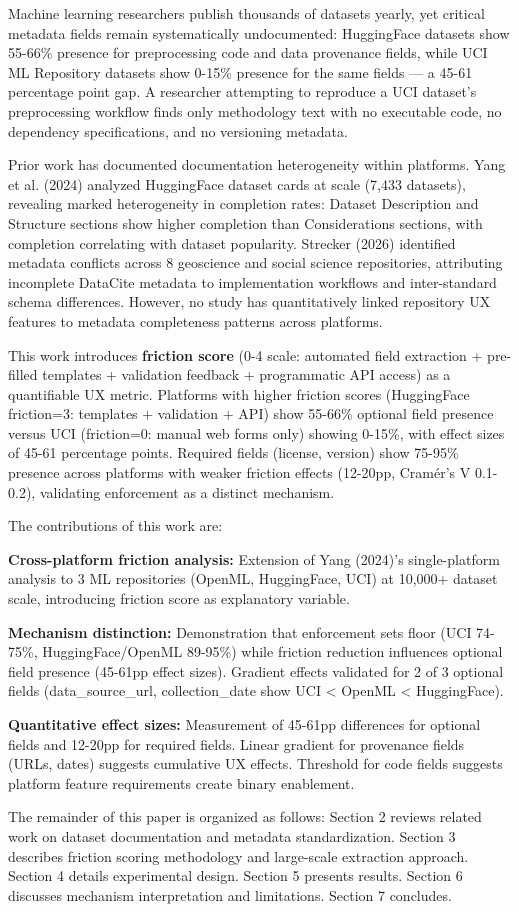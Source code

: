 
Machine learning researchers publish thousands of datasets yearly, yet critical metadata fields remain systematically undocumented: HuggingFace datasets show 55-66\% presence for preprocessing code and data provenance fields, while UCI ML Repository datasets show 0-15\% presence for the same fields --- a 45-61 percentage point gap. A researcher attempting to reproduce a UCI dataset's preprocessing workflow finds only methodology text with no executable code, no dependency specifications, and no versioning metadata.

Prior work has documented documentation heterogeneity within platforms. Yang et al. (2024) analyzed HuggingFace dataset cards at scale (7,433 datasets), revealing marked heterogeneity in completion rates: Dataset Description and Structure sections show higher completion than Considerations sections, with completion correlating with dataset popularity. Strecker (2026) identified metadata conflicts across 8 geoscience and social science repositories, attributing incomplete DataCite metadata to implementation workflows and inter-standard schema differences. However, no study has quantitatively linked repository UX features to metadata completeness patterns across platforms.

This work introduces \textbf{friction score} (0-4 scale: automated field extraction + pre-filled templates + validation feedback + programmatic API access) as a quantifiable UX metric. Platforms with higher friction scores (HuggingFace friction=3: templates + validation + API) show 55-66\% optional field presence versus UCI (friction=0: manual web forms only) showing 0-15\%, with effect sizes of 45-61 percentage points. Required fields (license, version) show 75-95\% presence across platforms with weaker friction effects (12-20pp, Cramér's V 0.1-0.2), validating enforcement as a distinct mechanism.

The contributions of this work are:

\textbf{Cross-platform friction analysis:} Extension of Yang (2024)'s single-platform analysis to 3 ML repositories (OpenML, HuggingFace, UCI) at 10,000+ dataset scale, introducing friction score as explanatory variable.

\textbf{Mechanism distinction:} Demonstration that enforcement sets floor (UCI 74-75\%, HuggingFace/OpenML 89-95\%) while friction reduction influences optional field presence (45-61pp effect sizes). Gradient effects validated for 2 of 3 optional fields (data\_source\_url, collection\_date show UCI < OpenML < HuggingFace).

\textbf{Quantitative effect sizes:} Measurement of 45-61pp differences for optional fields and 12-20pp for required fields. Linear gradient for provenance fields (URLs, dates) suggests cumulative UX effects. Threshold for code fields suggests platform feature requirements create binary enablement.

The remainder of this paper is organized as follows: Section 2 reviews related work on dataset documentation and metadata standardization. Section 3 describes friction scoring methodology and large-scale extraction approach. Section 4 details experimental design. Section 5 presents results. Section 6 discusses mechanism interpretation and limitations. Section 7 concludes.
